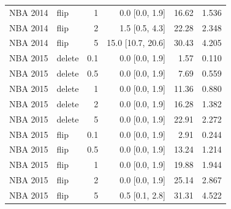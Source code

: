 \begin{longtable}{llrrrr}
NBA 2014 & flip & 1 & 0.0 [0.0, 1.9] & 16.62 & 1.536 \\
NBA 2014 & flip & 2 & 1.5 [0.5, 4.3] & 22.28 & 2.348 \\
NBA 2014 & flip & 5 & 15.0 [10.7, 20.6] & 30.43 & 4.205 \\
NBA 2015 & delete & 0.1 & 0.0 [0.0, 1.9] & 1.57 & 0.110 \\
NBA 2015 & delete & 0.5 & 0.0 [0.0, 1.9] & 7.69 & 0.559 \\
NBA 2015 & delete & 1 & 0.0 [0.0, 1.9] & 11.36 & 0.880 \\
NBA 2015 & delete & 2 & 0.0 [0.0, 1.9] & 16.28 & 1.382 \\
NBA 2015 & delete & 5 & 0.0 [0.0, 1.9] & 22.91 & 2.272 \\
NBA 2015 & flip & 0.1 & 0.0 [0.0, 1.9] & 2.91 & 0.244 \\
NBA 2015 & flip & 0.5 & 0.0 [0.0, 1.9] & 13.24 & 1.214 \\
NBA 2015 & flip & 1 & 0.0 [0.0, 1.9] & 19.88 & 1.944 \\
NBA 2015 & flip & 2 & 0.0 [0.0, 1.9] & 25.14 & 2.867 \\
NBA 2015 & flip & 5 & 0.5 [0.1, 2.8] & 31.31 & 4.522 \\
\bottomrule\end{longtable}
